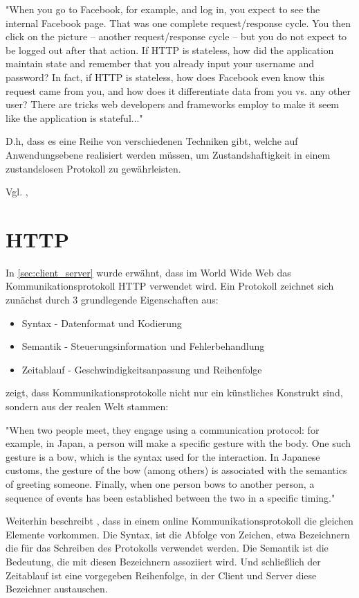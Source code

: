 "When you go to Facebook, for example, and log in, you expect to see the internal Facebook page. That was one complete request/response cycle. You then click on the picture -- another request/response cycle -- but you do not expect to be logged out after that action. If HTTP is stateless, how did the application maintain state and remember that you already input your username and password? In fact, if HTTP is stateless, how does Facebook even know this request came from you, and how does it differentiate data from you vs. any other user? There are tricks web developers and frameworks employ to make it seem like the application is stateful..."

D.h, dass es eine Reihe von verschiedenen Techniken gibt, welche auf Anwendungsebene realisiert werden müssen, um Zustandshaftigkeit in einem zustandslosen Protokoll zu gewährleisten.

Vgl. \cite[Background]{Parikh:2015}, \cite{Culloca:2006}

\section{HTTP}

In \ref{sec:client_server} wurde erwähnt, dass im World Wide Web das Kommunikationsprotokoll HTTP verwendet wird. Ein Protokoll zeichnet sich zunächst durch 3 grundlegende Eigenschaften aus:

\begin{itemize} 
\item Syntax - Datenformat und Kodierung
\item Semantik - Steuerungsinformation und Fehlerbehandlung
\item Zeitablauf - Geschwindigkeitsanpassung und Reihenfolge
\end{itemize}

\cite{Dubost:2012} zeigt, dass Kommunikationsprotokolle nicht nur ein künstliches Konstrukt sind, sondern aus der realen Welt stammen: 

"When two people meet, they engage using a communication protocol: for example, in Japan, a person will make a specific gesture with the body. One such gesture is a bow, which is the syntax used for the interaction. In Japanese customs, the gesture of the bow (among others) is associated with the semantics of greeting someone. Finally, when one person bows to another person, a sequence of events has been established between the two in a specific timing."

Weiterhin beschreibt \cite{Dubost:2012}, dass in einem online Kommunikationsprotokoll die gleichen Elemente vorkommen. Die Syntax, ist die Abfolge von Zeichen, etwa Bezeichnern die für das Schreiben des Protokolls verwendet werden. Die Semantik ist die Bedeutung, die mit diesen Bezeichnern assoziiert wird. Und schließlich der Zeitablauf ist eine vorgegeben Reihenfolge, in der Client und Server diese Bezeichner austauschen.

